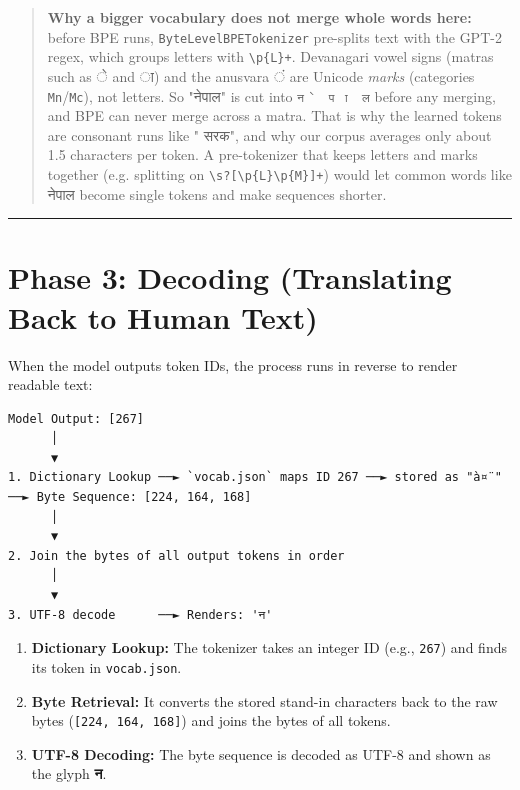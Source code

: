 \documentclass[11pt,a4paper,oneside]{report}
\providecommand{\tightlist}{\setlength{\itemsep}{0pt}\setlength{\parskip}{0pt}}
\begin{document}
\begin{quote}
\textbf{Why a bigger vocabulary does not merge whole words here:} before BPE runs, \texttt{ByteLevelBPETokenizer} pre-splits text with the GPT-2 regex, which groups letters with \texttt{\textbackslash{}p\{L\}+}. Devanagari vowel signs (matras such as े and ा) and the anusvara ं are Unicode \emph{marks} (categories \texttt{Mn}/\texttt{Mc}), not letters. So "नेपाल" is cut into \texttt{न\ \textbar{}\ े\ \textbar{}\ प\ \textbar{}\ ा\ \textbar{}\ ल} before any merging, and BPE can never merge across a matra. That is why the learned tokens are consonant runs like " सरक", and why our corpus averages only about 1.5 characters per token. A pre-tokenizer that keeps letters and marks together (e.g. splitting on \texttt{\textbackslash{}s?{[}\textbackslash{}p\{L\}\textbackslash{}p\{M\}{]}+}) would let common words like नेपाल become single tokens and make sequences shorter.
\end{quote}

\begin{center}\rule{0.5\linewidth}{0.5pt}\end{center}

\section{Phase 3: Decoding (Translating Back to Human Text)}\label{phase-3-decoding-translating-back-to-human-text}

When the model outputs token IDs, the process runs in reverse to render readable text:

\begin{Verbatim}[fontsize=\scriptsize]
Model Output: [267]
      │
      ▼
1. Dictionary Lookup ──► `vocab.json` maps ID 267 ──► stored as "à¤¨" ──► Byte Sequence: [224, 164, 168]
      │
      ▼
2. Join the bytes of all output tokens in order
      │
      ▼
3. UTF-8 decode      ──► Renders: 'न'
\end{Verbatim}

\begin{enumerate}
\def\labelenumi{\arabic{enumi}.}
\tightlist
\item
  \textbf{Dictionary Lookup:} The tokenizer takes an integer ID (e.g., \texttt{267}) and finds its token in \texttt{vocab.\allowbreak{}json}.
\item
  \textbf{Byte Retrieval:} It converts the stored stand-in characters back to the raw bytes (\texttt{{[}224,\ 164,\ 168{]}}) and joins the bytes of all tokens.
\item
  \textbf{UTF-8 Decoding:} The byte sequence is decoded as UTF-8 and shown as the glyph \textbf{न}.
\end{enumerate}
\end{document}
